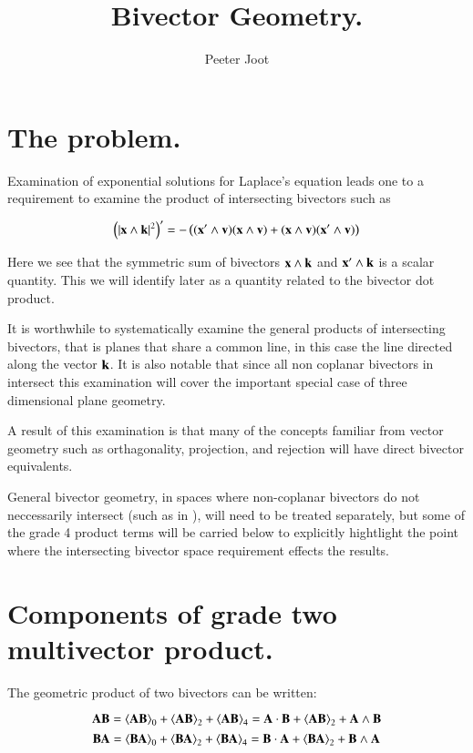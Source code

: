 \documentclass{article}      %
\title{Bivector Geometry.}
\author{Peeter Joot}         %
\newcommand{\gpgrade}[2] {{\left\langle{{#1}}\right\rangle}_{#2}}
\begin{document}

\maketitle{}

\section{ The problem. }

Examination of exponential solutions for Laplace's equation leads one to
a requirement to examine the product of intersecting bivectors such as

\[
\left(\lvert{\mathbf{x}\wedge \mathbf{k}}\rvert^2\right)' = -\left(
(\mathbf{x}' \wedge \mathbf{v})(\mathbf{x} \wedge \mathbf{v})
+(\mathbf{x} \wedge \mathbf{v})(\mathbf{x}' \wedge \mathbf{v})
\right)
\]

Here we see that the symmetric sum of bivectors $\mathbf{x} \wedge \mathbf{k}$ and $\mathbf{x}' \wedge \mathbf{k}$ is a scalar quantity.  This we will identify later as a quantity
related to the bivector dot product.

It is worthwhile to systematically examine the
general products of intersecting bivectors, that is planes that share a common line, in this case the line directed along the vector $\mathbf{k}$.
It is also notable that since all non coplanar bivectors in  intersect
this
examination will cover the important special case of three dimensional
plane geometry.

A result of this examination is that many of the concepts familiar from
vector geometry such as
orthagonality, projection, and rejection will have direct bivector
equivalents.

General bivector geometry, in spaces where non-coplanar bivectors do not 
neccessarily intersect (such as in ), will need to be treated separately,
but some of the grade 4 product terms will be carried below to explicitly
hightlight the point where the intersecting bivector space requirement
effects the results.

\section{Components of grade two multivector product.}

The geometric product of two bivectors can be written:

\begin{equation}\label{eqn:ABprod}
\BA \BB = 
\gpgrade{\BA \BB}{0}
+\gpgrade{\BA \BB}{2}
+\gpgrade{\BA \BB}{4}
= 
{\BA \cdot \BB}
+\gpgrade{\BA \BB}{2}
+{\BA \wedge \BB}
\end{equation}
\begin{equation}\label{eqn:BAprod}
\BB \BA = 
\gpgrade{\BB \BA}{0}
+\gpgrade{\BB \BA}{2}
+\gpgrade{\BB \BA}{4}
= 
{\BB \cdot \BA}
+\gpgrade{\BB \BA}{2}
+{\BB \wedge \BA}
\end{equation}
\end{document}
